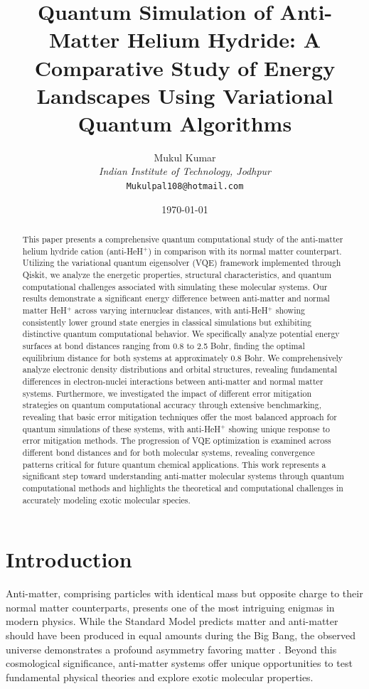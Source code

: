 \documentclass[10pt,twocolumn,a4paper]{article}
\title{\textbf{Quantum Simulation of Anti-Matter Helium Hydride: A Comparative Study of Energy Landscapes Using Variational Quantum Algorithms}}
\author{Mukul Kumar\\
\textit{Indian Institute of Technology, Jodhpur}\\
\texttt{Mukulpal108@hotmail.com}
}
\date{\today}
\begin{document}
\maketitle

\begin{abstract}
This paper presents a comprehensive quantum computational study of the anti-matter helium hydride cation (anti-HeH$^+$) in comparison with its normal matter counterpart. Utilizing the variational quantum eigensolver (VQE) framework implemented through Qiskit, we analyze the energetic properties, structural characteristics, and quantum computational challenges associated with simulating these molecular systems. Our results demonstrate a significant energy difference between anti-matter and normal matter HeH$^+$ across varying internuclear distances, with anti-HeH$^+$ showing consistently lower ground state energies in classical simulations but exhibiting distinctive quantum computational behavior. We specifically analyze potential energy surfaces at bond distances ranging from 0.8 to 2.5 Bohr, finding the optimal equilibrium distance for both systems at approximately 0.8 Bohr. We comprehensively analyze electronic density distributions and orbital structures, revealing fundamental differences in electron-nuclei interactions between anti-matter and normal matter systems. Furthermore, we investigated the impact of different error mitigation strategies on quantum computational accuracy through extensive benchmarking, revealing that basic error mitigation techniques offer the most balanced approach for quantum simulations of these systems, with anti-HeH$^+$ showing unique response to error mitigation methods. The progression of VQE optimization is examined across different bond distances and for both molecular systems, revealing convergence patterns critical for future quantum chemical applications. This work represents a significant step toward understanding anti-matter molecular systems through quantum computational methods and highlights the theoretical and computational challenges in accurately modeling exotic molecular species.
\end{abstract}

\section{Introduction}
Anti-matter, comprising particles with identical mass but opposite charge to their normal matter counterparts, presents one of the most intriguing enigmas in modern physics. While the Standard Model predicts matter and anti-matter should have been produced in equal amounts during the Big Bang, the observed universe demonstrates a profound asymmetry favoring matter \cite{baker2021matter}. Beyond this cosmological significance, anti-matter systems offer unique opportunities to test fundamental physical theories and explore exotic molecular properties.
\end{document}
